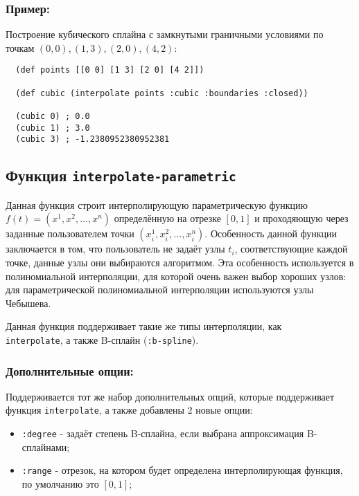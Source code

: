 \subsubsection{Пример:}

Построение кубического сплайна с замкнутыми граничными условиями по точкам $(0, 0), (1, 3), (2, 0), (4, 2)$:

\begin{verbatim}
  (def points [[0 0] [1 3] [2 0] [4 2]])

  (def cubic (interpolate points :cubic :boundaries :closed))

  (cubic 0) ; 0.0
  (cubic 1) ; 3.0
  (cubic 3) ; -1.2380952380952381
\end{verbatim}

\subsection{Функция \texttt{interpolate-parametric}}

Данная функция строит интерполирующую параметрическую функцию $f(t) = (x^1, x^2, \ldots, x^n)$ определённую на отрезке $[0, 1]$ и проходяющую через заданные пользователем точки $(x_i^1, x_i^2, \ldots, x_i^n)$. Особенность данной функции заключается в том, что пользователь не задаёт узлы $t_i$, соответствующие каждой точке, данные узлы они выбираются алгоритмом. Эта особенность используется в полиномиальной интерполяции, для которой очень важен выбор хороших узлов: для параметрической полиномиальной интерполяции используются узлы Чебышева.

Данная функция поддерживает такие же типы интерполяции, как \\ \texttt{interpolate}, а также B-сплайн (\texttt{:b-spline}).

\subsubsection{Дополнительные опции:}

Поддерживается тот же набор дополнительных опций, которые поддерживает функция \texttt{interpolate}, а также добавлены 2 новые опции:
\begin{itemize}
\item \texttt{:degree} - задаёт степень B-сплайна, если выбрана аппроксимация B-сплайнами;
\item \texttt{:range} - отрезок, на котором будет определена интерполирующая функция, по умолчанию это $[0, 1]$;
\end{itemize}

